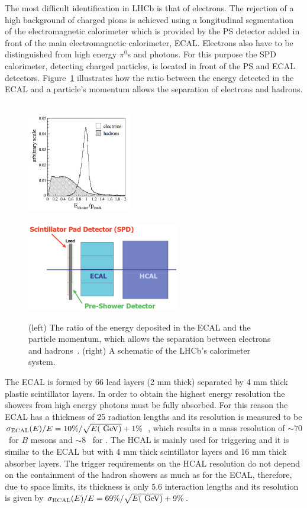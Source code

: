 The most difficult identification in LHCb is that of electrons. The rejection of a high background of charged pions
is achieved using a longitudinal segmentation of the electromagnetic calorimeter which is provided by
the PS detector added in front of the main electromagnetic calorimeter, ECAL. Electrons also have to be 
distinguished from high energy $\pi^0$s and photons. For this purpose the SPD calorimeter, detecting charged particles,
is located in front of the PS and ECAL detectors. Figure~\ref{fig:pi0_e_pid_perf} illustrates how the ratio between the
energy detected in the ECAL and a particle's momentum allows the separation of electrons and hadrons.

\begin{figure}[t!]
\centering
\includegraphics[width=0.4\textwidth,height=5.3cm]{Detector/figs/pi0_e_pid_perf.png}
\includegraphics[width=0.59\textwidth]{Detector/figs/calo_layout.png}
\caption{(left) The ratio of the energy deposited in the ECAL and the particle momentum, which allows
the separation between electrons and hadrons~\cite{Alves:2008zz}. (right) A schematic of the LHCb's calorimeter system. }
\label{fig:pi0_e_pid_perf}
\end{figure}

The ECAL is formed by 66 lead layers (2 mm thick) separated by 4 mm thick plastic scintillator layers.
In order to obtain the highest energy resolution the showers from high energy photons 
must be fully absorbed. For this reason the ECAL has a thickness of 25 radiation lengths and its resolution is 
measured to be $\sigma_{\rm ECAL}(E) / E = 10\% / \sqrt{E(\gev )} + 1\%$~\cite{Alves:2008zz},
which results in a mass resolution of $\sim 70$ \mevcc~for $B$ mesons and $\sim 8$ \mevcc~for \piz.
The HCAL is mainly used for triggering and it is similar to the ECAL but with 4 mm thick scintillator layers and 
16 mm thick absorber layers. The trigger requirements on the HCAL resolution do not depend on the containment of the hadron showers
as much as for the ECAL, therefore, due to space limits, its thickness is only 5.6 interaction lengths and its resolution is given by
 $\sigma_{\rm HCAL}(E) / E = 69\%/\sqrt{E(\gev )} + 9\%$.

